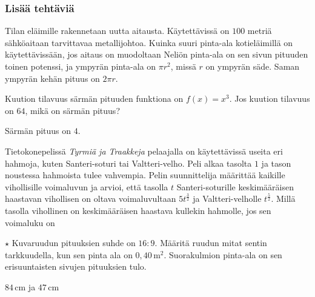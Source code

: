 \begin{tehtavasivu}
\subsubsection*{Lisää tehtäviä}

\begin{tehtava}%
Tilan eläimille rakennetaan uutta aitausta. Käytettävissä on $100$ metriä sähköaitaan tarvittavaa metallijohtoa. Kuinka suuri pinta-ala kotieläimillä on käytettävissään, jos aitaus on muodoltaan
Neliön pinta-ala on sen sivun pituuden toinen potenssi, ja ympyrän pinta-ala on $\pi r^2$, missä $r$ on ympyrän säde. Saman ympyrän kehän pituus on $2\pi r$.
\begin{vastaus}
\end{vastaus}
\end{tehtava}

\begin{tehtava}
Kuution tilavuus särmän pituuden funktiona on $f(x) = x^3$. Jos kuution tilavuus on $64$, mikä on särmän pituus?
\begin{vastaus}
Särmän pituus on $4$.
\end{vastaus}
\end{tehtava}

\begin{tehtava}
Tietokonepelissä \emph{Tyrmiä ja Traakkeja} pelaajalla on käytettävissä useita eri hahmoja, kuten Santeri-soturi tai Valtteri-velho. Peli alkaa tasolta $1$ ja tason noustessa hahmoista tulee vahvempia. Pelin suunnittelija määrittää kaikille vihollisille voimaluvun ja arvioi, että tasolla $t$ Santeri-soturille keskimääräisen haastavan vihollisen on oltava voimaluvultaan $5t^{\frac{3}{2}}$ ja Valtteri-velholle $t^{\frac{5}{2}}$. Millä tasolla vihollinen on keskimääräisen haastava kullekin hahmolle, jos sen voimaluku on
\begin{vastaus}
\end{vastaus}
\end{tehtava}

\begin{tehtava}
$\star$ Kuvaruudun pituuksien suhde on $16:9$. Määritä ruudun mitat sentin tarkkuudella, kun sen pinta ala on $0,40\,\mathrm{m}^2$. Suorakulmion pinta-ala on sen erisuuntaisten sivujen pituuksien tulo.
\begin{vastaus}
$84\,$cm ja $47$\,cm
\end{vastaus}
\end{tehtava}


\end{tehtavasivu}

